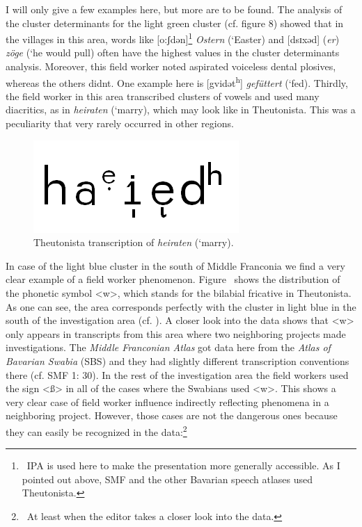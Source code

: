 \documentclass[output=paper]{LSP/langsci}
\begin{document}
I will only give a few examples here, but more are to be found. The analysis of the cluster determinants for the light green cluster (cf. figure 8) showed that in the villages in this area, words like [o:ʃdən]\footnote{\ IPA is used here to make the presentation more generally accessible. As I pointed out above, SMF and the other Bavarian speech atlases used Theutonista.} \textit{Ostern} (`Easter{\textquotesingle}) and [dsɪxəd] (\textit{er}) \textit{zöge} (`he would pull{\textquotesingle}) often have the highest values in the cluster determinants{\textquotesingle} analysis. Moreover, this field worker noted aspirated voiceless dental plosives, whereas the others didn{\textquotesingle}t. One example here is [gvidət\textsuperscript{h}] \textit{gefüttert} (`fed{\textquotesingle}). Thirdly, the field worker in this area transcribed clusters of vowels and used many diacritics, as in \textit{heiraten} (`marry{\textquotesingle}), which may look like  in Theutonista. This was a peculiarity that very rarely occurred in other regions.

\begin{figure}
\includegraphics[width=.25\textwidth]{illustrations/mathus_fig9}
\caption{Theutonista transcription of \textit{heiraten} (`marry{\textquotesingle}).}
\label{fig:9}
\end{figure}


In case of the light blue cluster in the south of Middle Franconia we find a very clear example of a field worker phenomenon. Figure~ shows the distribution of the phonetic symbol {\textless}w{\textgreater}, which stands for the bilabial fricative in Theutonista. As one can see, the area corresponds perfectly with the cluster in light blue in the south of the investigation area (cf. ). A closer look into the data shows that {\textless}w{\textgreater} only appears in transcripts from this area where two neighboring projects made investigations. The \textit{Middle Franconian Atlas} got data here from the \textit{Atlas of Bavarian Swabia} (SBS) and they had slightly different transcription conventions there (cf. SMF 1: 30). In the rest of the investigation area the field workers used the sign {\textless}ß{\textgreater} in all of the cases where the Swabians used {\textless}w{\textgreater}. This shows a very clear case of field worker influence indirectly reflecting phenomena in a neighboring project. However, those cases are not the dangerous ones because they can easily be recognized in the data:\footnote{\ At least when the editor takes a closer look into the data.}
\end{document}
